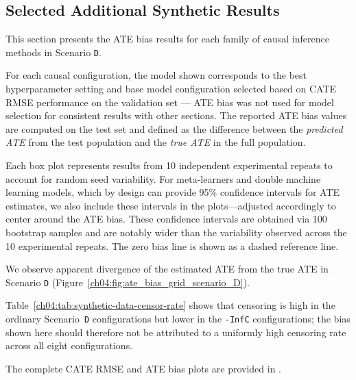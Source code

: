 
\subsection{Selected Additional Synthetic Results}\label{ch04:app:additional_synthetic_exps}

\label{ch04:app:more-ate-plots}

This section presents the ATE bias results for each family of causal inference methods in Scenario \texttt{D}.

For each causal configuration, the model shown corresponds to the best hyperparameter setting and base model configuration selected based on CATE RMSE performance on the validation set --- ATE bias was not used for model selection for consistent results with other sections.
The reported ATE bias values are computed on the test set and defined as the difference between the \emph{predicted ATE} from the test population and the \emph{true ATE} in the full population.

Each box plot represents results from 10 independent experimental repeats to account for random seed variability.
For meta-learners and double machine learning models, which by design can provide 95\% confidence intervals for ATE estimates, we also include these intervals in the plots---adjusted accordingly to center around the ATE bias.
These confidence intervals are obtained via 100 bootstrap samples and are notably wider than the variability observed across the 10 experimental repeats.
The zero bias line is shown as a dashed reference line.



We observe apparent divergence of the estimated ATE from the true ATE in Scenario \texttt{D} (Figure~\ref{ch04:fig:ate_bias_grid_scenario_D}).

Table~\ref{ch04:tab:synthetic-data-censor-rate} shows that censoring is high in the ordinary Scenario~\texttt{D} configurations but lower in the \texttt{-InfC} configurations; the bias shown here should therefore not be attributed to a uniformly high censoring rate across all eight configurations.

The complete CATE RMSE and ATE bias plots are provided in \citet[Appendices F.4--F.5, Figures 8--17]{noroozizadeh2026survhte}.
